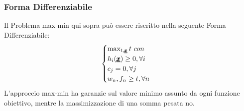\subsubsection{Forma Differenziabile}
Il Problema max-min qui sopra può essere riscritto nella seguente Forma Differenziabile:
\begin{equation*}
    \begin{cases}
    \max_{t, \pmb{\underline{x}}} t \
    con \\ h_i(\pmb{\underline{x}}) \geq 0, \forall i\\
    c_j = 0, \forall j \\
    w_n,f_n \geq t, \forall n
    \end{cases}
\end{equation*}
L'approccio max-min ha garanzie sul valore minimo assunto da ogni funzione obiettivo, mentre la massimizzazione di una somma pesata no.

